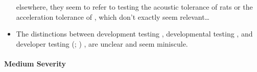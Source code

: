 \begin{itemize}
          elsewhere, they seem to refer to testing the acoustic tolerance of
          rats \citep{HolleyEtAl1996} or the acceleration tolerance of
          \accelTolTest{}, which don't exactly seem relevant\dots\fi
    \item The distinctions between development testing \citep[p.~136]{IEEE2017},
          developmental testing \citep[p.~30]{Firesmith2015}, and developer
          testing
          \ifnotpaper
              (\citealp[p.~39]{Firesmith2015}; \citealp[p.~11]{Gerrard2000a})
          \else
              \cite[p.~39]{Firesmith2015}, \cite[p.~11]{Gerrard2000a}
          \fi are unclear and seem miniscule.
          \ifnotpaper
\end{itemize}

\paragraph{Medium Severity}
